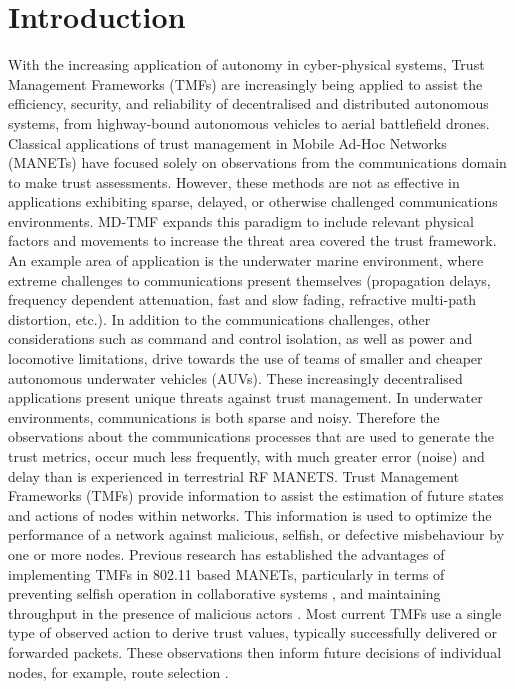 \section{Introduction}
With the increasing application of autonomy in cyber-physical systems, Trust Management Frameworks (TMFs) are increasingly being applied to assist the efficiency, security, and reliability of decentralised and distributed autonomous systems, from highway-bound autonomous vehicles to aerial battlefield drones. 
Classical applications of trust management in Mobile Ad-Hoc Networks (MANETs) have focused solely on observations from the communications domain to make trust assessments. 
However, these methods are not as effective in applications exhibiting sparse, delayed, or otherwise challenged communications environments\cite{Pavan2015}. MD-TMF expands this paradigm to include relevant physical factors and movements to increase the threat area covered the trust framework. An example area of application is the underwater marine environment, where extreme challenges to communications present themselves (propagation delays, frequency dependent attenuation, fast and slow fading, refractive multi-path distortion, etc.).
In addition to the communications challenges, other considerations such as command and control isolation, as well as power and locomotive limitations, drive towards the use of teams of smaller and cheaper autonomous underwater vehicles (AUVs). These increasingly decentralised applications present unique threats against trust management. In underwater environments, communications is both sparse and noisy.
Therefore the observations about the communications processes that are used to generate the trust metrics, occur much less frequently, with much greater error (noise) and delay than is experienced in terrestrial RF MANETS.
Trust Management Frameworks (TMFs) provide information to assist the estimation of future states and actions of nodes within networks. This information is used to optimize the performance of a network against malicious, selfish, or defective misbehaviour by one or more nodes. Previous research has established the advantages of implementing TMFs in 802.11 based MANETs, particularly in terms of preventing selfish operation in collaborative systems \cite{Li2007}, and maintaining throughput in the presence of malicious actors \cite{Buchegger2002}. Most current TMFs use a single type of observed action to derive trust values, typically successfully delivered or forwarded packets. These observations then inform future decisions of individual nodes, for example, route selection \cite{Li2008}.
